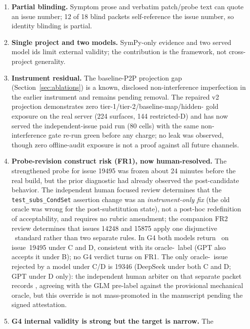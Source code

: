 \begin{enumerate}[leftmargin=1.7em,itemsep=3pt,topsep=3pt]
  example, 15875 has two candidate-era collateral failures outside the dataset
  P2P id set) that do not score but bound what ``accept'' means and remain open
  for human review.
  \item \textbf{Partial blinding.} Symptom prose and verbatim patch/probe text
  can quote an issue number; 12 of 18 blind packets self-reference the issue
  number, so identity blinding is partial.
  \item \textbf{Single project and two models.} SymPy-only evidence and two
  served model ids limit external validity; the contribution is the framework,
  not cross-project generality.
  \item \textbf{Instrument residual.} The baseline-P2P projection gap
  (Section~\ref{sec:ablations}) is a known, disclosed non-interference
  imperfection in the earlier instrument and remains pending removal. The
  repaired v2 projection demonstrates zero tier-1/tier-2/baseline-map/hidden-
  gold exposure on the real server (224 surfaces, 144 restricted-D) and has now
  served the independent-issue paid run (80 cells) with the same non-
  interference gate re-run green before any charge; no leak was observed,
  though zero offline-audit exposure is not a proof against all future
  channels.
  \item \textbf{Probe-revision construct risk (FR1), now human-resolved.} The
  strengthened probe for issue 19495 was frozen about 24 minutes before the
  real build, but the prior diagnostic had already observed the post-candidate
  behavior. The independent human focused review determines that the
  \texttt{test\_subs\_CondSet} assertion change was an \emph{instrument-only
  fix} (the old oracle was wrong for the post-substitution state), not a
  post-hoc redefinition of acceptability, and requires no rubric amendment; the
  companion FR2 review determines that issues 14248 and 15875 apply one
  disjunctive \REJECT\ standard rather than two separate rules. In G4 both
  models return \ACCEPT\ on issue~19495 under C and D, consistent with its
  oracle-\ACCEPT\ label (GPT also accepts it under B); no G4 verdict turns on
  FR1. The only oracle-\ACCEPT\ issue rejected by a model under C/D is 19346
  (DeepSeek under both C and D; GPT under D only): the independent human
  arbiter on that separate packet records \REJECT, agreeing with the GLM
  pre-label against the provisional mechanical oracle, but this override is
  not mass-promoted in the manuscript pending the signed attestation.
  \item \textbf{G4 internal validity is strong but the target is narrow.} The

\end{enumerate}
